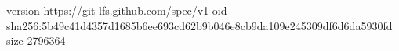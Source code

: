 version https://git-lfs.github.com/spec/v1
oid sha256:5b49c41d4357d1685b6ee693cd62b9b046e8cb9da109e245309df6d6da5930fd
size 2796364
